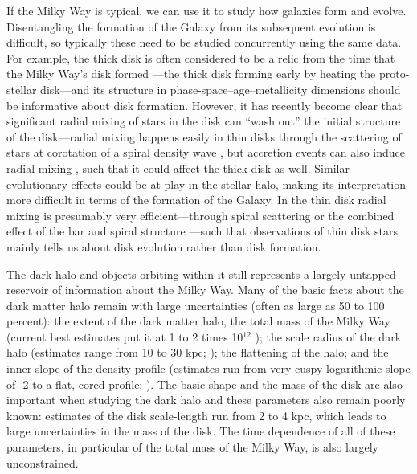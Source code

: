 If the Milky Way is typical, we can use it to study how galaxies form
and evolve. Disentangling the formation of the Galaxy from its
subsequent evolution is difficult, so typically these need to be
studied concurrently using the same data. For example, the thick disk
is often considered to be a relic from the time that the Milky Way's
disk formed \citep{Freeman02a}---the thick disk forming early by
heating the proto-stellar disk---and its structure in
phase-space--age--metallicity dimensions should be informative about
disk formation. However, it has recently become clear that significant
radial mixing of stars in the disk can ``wash out'' the initial
structure of the disk---radial mixing happens easily in thin disks
through the scattering of stars at corotation of a spiral density wave
\citep{sellwood02a}, but accretion events can also induce radial
mixing \citep{Quillen09a}, such that it could affect the thick disk as
well. Similar evolutionary effects could be at play in the stellar
halo, making its interpretation more difficult in terms of the
formation of the Galaxy. In the thin disk radial mixing is presumably
very efficient---through spiral scattering or the combined effect of
the bar and spiral structure \citep{sellwood02a,Minchev09b}---such
that observations of thin disk stars mainly tells us about disk
evolution rather than disk formation.

The dark halo and objects orbiting within it still represents a
largely untapped reservoir of information about the Milky Way. Many of
the basic facts about the dark matter halo remain with large
uncertainties (often as large as 50 to 100\,percent): the extent of
the dark matter halo, the total mass of the Milky Way (current best
estimates put it at 1 to 2 times 10$^{12}$ \Msol); the scale radius of
the dark halo (estimates range from 10 to 30
kpc; \citealt{Smith07a,Xue08a}); the flattening of the halo; and the
inner slope of the density profile (estimates run from very cuspy
logarithmic slope of -2 to a flat, cored
profile; \citealt{2008gady.book.....B}). The basic shape and the mass
of the disk are also important when studying the dark halo and these
parameters also remain poorly known: estimates of the disk
scale-length run from 2 to 4 kpc, which leads to large uncertainties
in the mass of the disk. The time dependence of all of these
parameters, in particular of the total mass of the Milky Way, is also
largely unconstrained.

